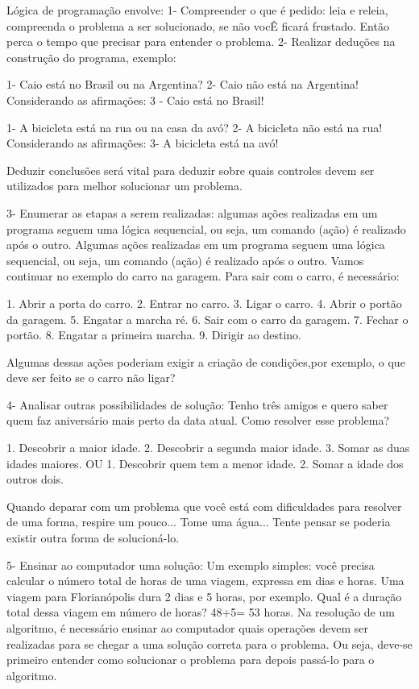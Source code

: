 Lógica de programação envolve:
1- Compreender o que é pedido: leia e releia, compreenda o problema a ser solucionado, se não vocÊ ficará frustado. Então perca o tempo que precisar para entender o problema.
2- Realizar deduções na construção do programa, exemplo:

1- Caio está no Brasil ou na Argentina?
2- Caio não está na Argentina!
Considerando as afirmações:
3 - Caio está no Brasil!

1- A bicicleta está na rua ou na casa da avó?
2- A bicicleta não está na rua!
Considerando as afirmações:
3- A bicicleta está na avó!

Deduzir conclusões será vital para deduzir sobre quais controles devem ser utilizados para melhor solucionar um problema.

3- Enumerar as etapas a serem realizadas: algumas ações realizadas em um programa seguem uma lógica sequencial,
ou seja, um comando (ação) é realizado após o outro.
Algumas ações realizadas em um programa seguem uma lógica sequencial,
ou seja, um comando (ação) é realizado após o outro. Vamos continuar no
exemplo do carro na garagem. Para sair com o carro, é necessário:

1. Abrir a porta do carro.
2. Entrar no carro.
3. Ligar o carro.
4. Abrir o portão da garagem.
5. Engatar a marcha ré.
6. Sair com o carro da garagem.
7. Fechar o portão.
8. Engatar a primeira marcha.
9. Dirigir ao destino.

Algumas dessas ações poderiam exigir a criação de condições,por exemplo, o que deve ser feito se o carro não ligar?

4- Analisar outras possibilidades de solução: Tenho três amigos e quero saber quem faz aniversário mais perto da data atual.
Como resolver esse problema?

1. Descobrir a maior idade.
2. Descobrir a segunda maior idade.
3. Somar as duas idades maiores.
OU
1. Descobrir quem tem a menor idade.
2. Somar a idade dos outros dois.

Quando deparar com um problema que você está com dificuldades
para resolver de uma forma, respire um pouco... Tome uma água... Tente
pensar se poderia existir outra forma de solucioná-lo.

5- Ensinar ao computador uma solução: Um exemplo simples: você precisa calcular o número total de horas de uma
viagem, expressa em dias e horas. Uma viagem para Florianópolis dura 2 dias e 5 horas, por exemplo.
Qual é a duração total dessa viagem em número de horas?
48+5= 53 horas.
Na resolução de um algoritmo, é necessário ensinar ao computador quais operações devem ser realizadas para se chegar a uma solução correta
para o problema. Ou seja, deve-se primeiro entender como solucionar o problema para depois passá-lo para o algoritmo.

